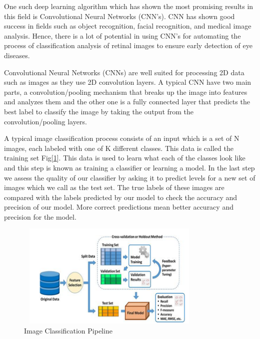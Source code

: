 \documentclass[conference]{IEEEtran}
\begin{document}
\vspace{5pt}
One such deep learning algorithm which has shown the most promising results in this field is Convolutional Neural Networks (CNN's). CNN has shown good success in fields such as object recognition, facial recognition, and medical image analysis. Hence, there is a lot of potential in using CNN's for automating the process of classification analysis of retinal images to ensure early detection of eye diseases.

\vspace{5pt}
Convolutional Neural Networks (CNNs) are well suited for processing 2D data such as images as they use 2D convolution layers. A typical CNN have two main parts, a convolution/pooling mechanism that breaks up the image into features and analyzes them and the other one is a fully connected layer that predicts the best label to classify the image by taking the output from the convolution/pooling layers.

\vspace{5pt}
A typical image classification process consists of an input which is a set of N images, each labeled with one of K different classes. This data is called the training set Fig[\ref{fig 1:Image Classification Pipeline}]. This data is used to learn what each of the classes look like and this step is known as training a classifier or learning a model. In the last step we assess the quality of our classifier by asking it to predict levels for a new set of images which we call as the test set. The true labels of these images are compared with the labels predicted by our model to check the accuracy and precision of our model. More correct predictions mean better accuracy and precision for the model.

\begin{figure}[ht]
    \centering
    \includegraphics[width=9cm, height = 5cm]{Images/Architecture.png}
    \caption{Image Classification Pipeline}
    \label{fig 1:Image Classification Pipeline}
\end{figure}
\end{document}
